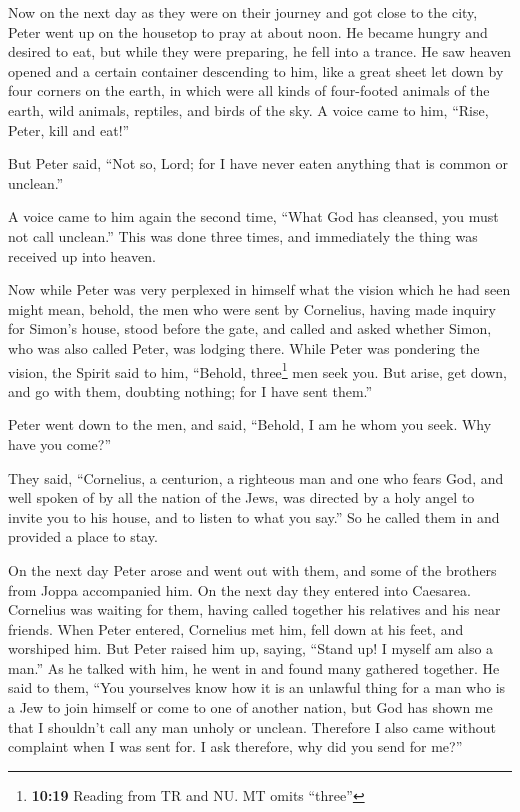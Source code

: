  Now on the next day as they were on their journey and got
close to the city, Peter went up on the housetop to pray at about noon.
 He became hungry and desired to eat, but while they were
preparing, he fell into a trance.  He saw heaven opened
and a certain container descending to him, like a great sheet let down
by four corners on the earth,  in which were all kinds of
four-footed animals of the earth, wild animals, reptiles, and birds of
the sky.  A voice came to him, ``Rise, Peter, kill and
eat!''

 But Peter said, ``Not so, Lord; for I have never eaten
anything that is common or unclean.''

 A voice came to him again the second time, ``What God
has cleansed, you must not call unclean.''  This was done
three times, and immediately the thing was received up into heaven.

 Now while Peter was very perplexed in himself what the
vision which he had seen might mean, behold, the men who were sent by
Cornelius, having made inquiry for Simon's house, stood before the gate,
 and called and asked whether Simon, who was also called
Peter, was lodging there.  While Peter was pondering the
vision, the Spirit said to him, ``Behold, three\footnote{\textbf{10:19}
  Reading from TR and NU. MT omits ``three''} men seek you.
 But arise, get down, and go with them, doubting nothing;
for I have sent them.''

 Peter went down to the men, and said, ``Behold, I am he
whom you seek. Why have you come?''

 They said, ``Cornelius, a centurion, a righteous man and
one who fears God, and well spoken of by all the nation of the Jews, was
directed by a holy angel to invite you to his house, and to listen to
what you say.''  So he called them in and provided a
place to stay.

On the next day Peter arose and went out with them, and some of the
brothers from Joppa accompanied him.  On the next day
they entered into Caesarea. Cornelius was waiting for them, having
called together his relatives and his near friends.  When
Peter entered, Cornelius met him, fell down at his feet, and worshiped
him.  But Peter raised him up, saying, ``Stand up! I
myself am also a man.''  As he talked with him, he went
in and found many gathered together.  He said to them,
``You yourselves know how it is an unlawful thing for a man who is a Jew
to join himself or come to one of another nation, but God has shown me
that I shouldn't call any man unholy or unclean. 
Therefore I also came without complaint when I was sent for. I ask
therefore, why did you send for me?''

